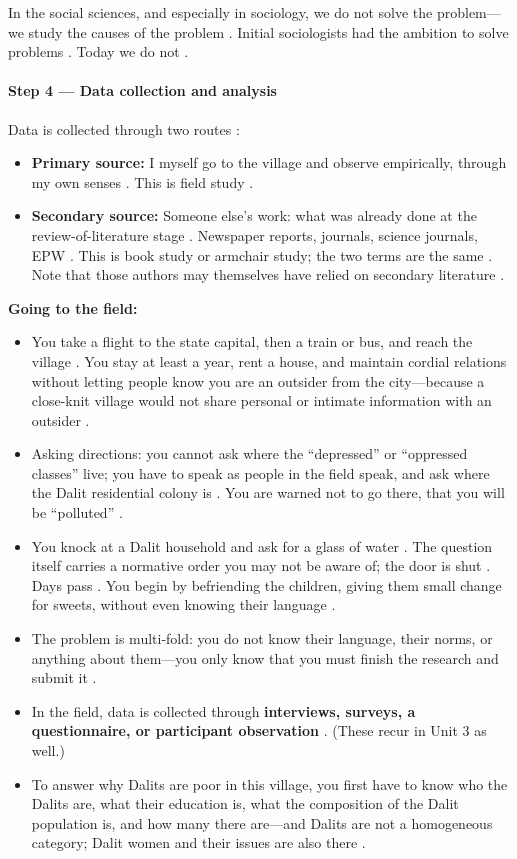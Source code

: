 \begin{CriticalPoint}
In the social sciences, and especially in sociology, we do not solve the problem---we study the causes of the problem . Initial sociologists had the ambition to solve problems . Today we do not .
\end{CriticalPoint}

\paragraph{Step 4 --- Data collection and analysis}
Data is collected through two routes :
\begin{itemize}
    \item \textbf{Primary source:} I myself go to the village and observe empirically, through my own senses . This is field study .
    \item \textbf{Secondary source:} Someone else's work: what was already done at the review-of-literature stage . Newspaper reports, journals, science journals, EPW . This is book study or armchair study; the two terms are the same . Note that those authors may themselves have relied on secondary literature .
\end{itemize}

\begin{ExampleBox}
\textbf{Going to the field:}
\begin{itemize}
    \item You take a flight to the state capital, then a train or bus, and reach the village . You stay at least a year, rent a house, and maintain cordial relations without letting people know you are an outsider from the city---because a close-knit village would not share personal or intimate information with an outsider .
    \item Asking directions: you cannot ask where the ``depressed'' or ``oppressed classes'' live; you have to speak as people in the field speak, and ask where the Dalit residential colony is . You are warned not to go there, that you will be ``polluted'' .
    \item You knock at a Dalit household and ask for a glass of water . The question itself carries a normative order you may not be aware of; the door is shut . Days pass . You begin by befriending the children, giving them small change for sweets, without even knowing their language .
    \item The problem is multi-fold: you do not know their language, their norms, or anything about them---you only know that you must finish the research and submit it .
    \item In the field, data is collected through \textbf{interviews, surveys, a questionnaire, or participant observation} . (These recur in Unit 3 as well.) 
    \item To answer why Dalits are poor in this village, you first have to know who the Dalits are, what their education is, what the composition of the Dalit population is, and how many there are---and Dalits are not a homogeneous category; Dalit women and their issues are also there .
\end{itemize}
\end{ExampleBox}


